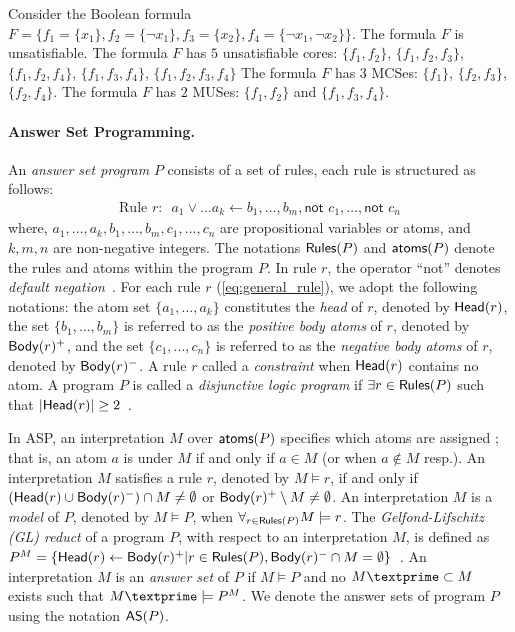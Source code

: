 \begin{example}
    Consider the Boolean formula $F = \{f_1 = \{x_1\}, f_2 = \{\neg{x_1}\}, f_3 = \{x_2\}, f_4 = \{\neg{x_1}, \neg{x_2}\}\}$.
    The formula $F$ is unsatisfiable. 
    The formula $F$ has $5$ unsatisfiable cores: $\{f_1,f_2\}$, $\{f_1,f_2,f_3\}$, $\{f_1,f_2,f_4\}$, $\{f_1,f_3,f_4\}$, $\{f_1,f_2,f_3,f_4\}$ 
    The formula $F$ has $3$ MCSes: $\{f_1\}$, $\{f_2,f_3\}$, $\{f_2,f_4\}$.
    The formula $F$ has $2$ MUSes: $\{f_1,f_2\}$ and $\{f_1,f_3,f_4\}$.
\end{example}
\paragraph{Answer Set Programming.}
An \textit{answer set program} $P$ consists of a set of rules, each rule is structured as follows:
\begin{align}
\label{eq:general_rule}
\text{Rule $r$:~~}a_1 \vee \ldots a_k \leftarrow b_1, \ldots, b_m, \textsf{not } c_1, \ldots, \textsf{not } c_n
\end{align}
where, $a_1, \ldots, a_k, b_1, \ldots, b_m, c_1, \ldots, c_n$ are propositional variables or atoms, and $k,m,n$ are non-negative integers. 
The notations $\mathsf{Rules}(P)$ and $\mathsf{atoms}(P)$ denote the rules and atoms within the program $P$. 
In rule $r$, the operator ``\textsf{not}'' denotes \textit{default negation}~\cite{clark1978}. For each 
rule $r$ (\cref{eq:general_rule}), we adopt the following notations: the atom set $\{a_1, \ldots, a_k\}$ constitutes the {\em head} of $r$, denoted by $\mathsf{Head}(r)$, the set $\{b_1, \ldots, b_m\}$ is referred to as the {\em positive body atoms} of $r$, denoted by $\mathsf{Body}(r)^+$, and the set $\{c_1, \ldots, c_n\}$ is referred to as the \textit{negative body atoms} of $r$, denoted by $\mathsf{Body}(r)^-$.
A rule $r$ called a {\em constraint} when $\mathsf{Head}(r)$ contains no atom.
A program $P$ is called a {\em disjunctive logic program} if $\exists r \in \mathsf{Rules}(P)$ such that $|\mathsf{Head}(r)| \geq 2$~\cite{BD1994}.

In ASP, an interpretation $M$ over $\mathsf{atoms}(P)$ specifies which atoms are assigned \true; that is, an atom $a$ is \true under $M$ if and only if $a \in M$ (or \false when $a \not\in M$ resp.). 
%
An interpretation $M$ satisfies a rule $r$, denoted by $M \models r$, if and only if $(\mathsf{Head}(r) \cup \mathsf{Body}(r)^{-}) \cap M \neq \emptyset$ or $\mathsf{Body}(r)^{+} \setminus M \neq \emptyset$. An interpretation $M$ is a {\em model} of $P$, denoted by $M \models P$, when $\forall_{r \in \mathsf{Rules}(P)} M \models r$. 
%
The \textit{Gelfond-Lifschitz (GL) reduct} of a program $P$, with respect to an interpretation $M$, is defined as $P^M = \{\mathsf{Head}(r) \leftarrow \mathsf{Body}(r)^+| r \in \mathsf{Rules}(P), \mathsf{Body}(r)^- \cap M = \emptyset\}$~\cite{GL1991}.
%
An interpretation $M$ is an {\em answer set} of $P$ if $M \models P$ and no $M\textprime \subset M$ exists such that $M\textprime \models P^M$.
%
We denote the answer sets of program $P$ using the notation $\mathsf{AS}(P)$.
